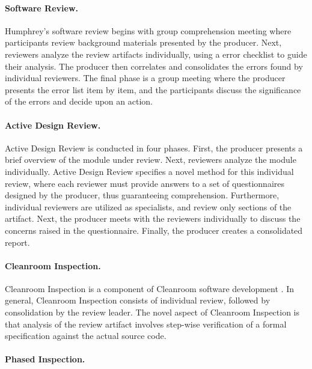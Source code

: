 \paragraph {Software Review.}

Humphrey's software review \cite{Humphrey90} begins with group
comprehension meeting where participants review background materials
presented by the producer. Next, reviewers analyze the review artifacts
individually, using a error checklist to guide their analysis.  The
producer then correlates and consolidates the errors found by individual
reviewers.  The final phase is a group meeting where the producer presents
the error list item by item, and the participants discuss the significance
of the errors and decide upon an action.

\paragraph{Active Design Review.}

Active Design Review \cite{Parnas85} is conducted in four phases.  First,
the producer presents a brief overview of the module under review.  Next,
reviewers analyze the module individually.  Active Design Review specifies
a novel method for this individual review, where each reviewer must provide
answers to a set of questionnaires designed by the producer, thus
guaranteeing comprehension.  Furthermore, individual reviewers are utilized
as specialists, and review only sections of the artifact.  Next, the
producer meets with the reviewers individually to discuss the concerns
raised in the questionnaire. Finally, the producer creates a consolidated
report.

\paragraph{Cleanroom Inspection.}

Cleanroom Inspection is a component of Cleanroom software development
\cite{Dyer92a}.  In general, Cleanroom Inspection consists of individual
review, followed by consolidation by the review leader.  The novel aspect
of Cleanroom Inspection is that analysis of the review artifact involves
step-wise verification of a formal specification against the actual source
code.

\paragraph{Phased Inspection.}

